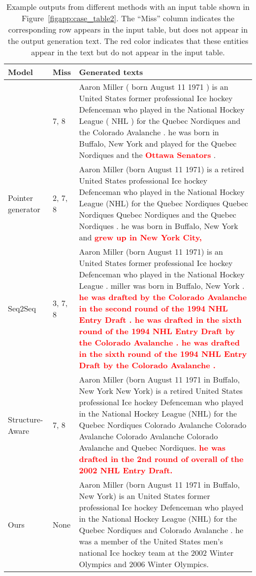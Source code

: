 \documentclass[11pt,a4paper]{article}
\newcommand{\quotes}[1]{``#1''}
\begin{document}
\begin{table*}[t]
    \centering
    \begin{tabularx}{\textwidth}{l|p{2.3cm}|X}
    \toprule
         Model & Miss & Generated texts\\ 
         \hline
          \cite{Wang2018} & \small{7, 8}& \small{Aaron Miller ( born August 11 1971 ) is an United States former professional Ice hockey Defenceman who played in the National Hockey League ( NHL ) for the Quebec Nordiques and the Colorado Avalanche . he was born in Buffalo, New York and played for the Quebec Nordiques and the \textcolor{red}{\textbf{Ottawa Senators}} .}\\
         \hline
         Pointer generator & \small{2, 7, 8}& \small{Aaron Miller (born August 11 1971) is a retired United States professional Ice hockey Defenceman who played in the National Hockey League (NHL) for the Quebec Nordiques Quebec Nordiques Quebec Nordiques and the Quebec Nordiques . he was born in Buffalo, New York and \textcolor{red}{\textbf{grew up in New York City,}}} \\
         \hline
         Seq2Seq & \small{3, 7, 8}& \small{Aaron Miller (born August 11 1971) is an United States former professional Ice hockey Defenceman who played in the National Hockey League . miller was born in Buffalo, New York . \textcolor{red}{\textbf{he was drafted by the Colorado Avalanche in the second round of the 1994 NHL Entry Draft . he was drafted in the sixth round of the 1994 NHL Entry Draft by the Colorado Avalanche . he was drafted in the sixth round of the 1994 NHL Entry Draft by the Colorado Avalanche . }}}\\
         \hline
         Structure-Aware & \small{ 7, 8}& \small{Aaron Miller (born August 11 1971 in Buffalo, New York New York) is a retired United States professional Ice hockey Defenceman who played in the National Hockey League (NHL) for the Quebec Nordiques Colorado Avalanche Colorado Avalanche Colorado Avalanche Colorado Avalanche and Quebec Nordiques. \textcolor{red}{\textbf{he was drafted in the 2nd round of overall of the 2002 NHL Entry Draft.}}} \\
         \hline
         Ours & \small{None}& \small{Aaron Miller (born August 11 1971 in Buffalo, New York) is an United States former professional Ice hockey Defenceman who played in the National Hockey League (NHL) for the Quebec Nordiques and Colorado Avalanche . he was a member of the United States men's national Ice hockey team at the 2002 Winter Olympics and 2006 Winter Olympics.}\\
         \hline\hline
    \end{tabularx}
    \caption{Example outputs from different methods with an input table shown in Figure~\ref{figapp:case_table2}. The \quotes{Miss} column indicates the corresponding row appears in the input table, but does not appear in the output generation text. The red color indicates that these entities appear in the text but do not appear in the input table.}
    \label{tabapp:gen_example_2}
    \vspace{-0.3cm}
\end{table*}
\end{document}

